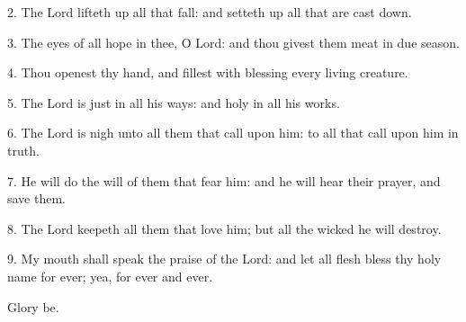 
2. The Lord lifteth up all that fall: and setteth up all that are cast down.

3. The eyes of all hope in thee, O Lord: and thou givest them meat in due season.

4. Thou openest thy hand, and fillest with blessing every living creature.

5. The Lord is just in all his ways: and holy in all his works.

6. The Lord is nigh unto all them that call upon him: to all that call upon him in truth.

7. He will do the will of them that fear him: and he will hear their prayer, and save them.

8. The Lord keepeth all them that love him; but all the wicked he will destroy.

9. My mouth shall speak the praise of the Lord: and let all flesh bless thy holy name for ever; yea, for ever and ever. 

Glory be.
